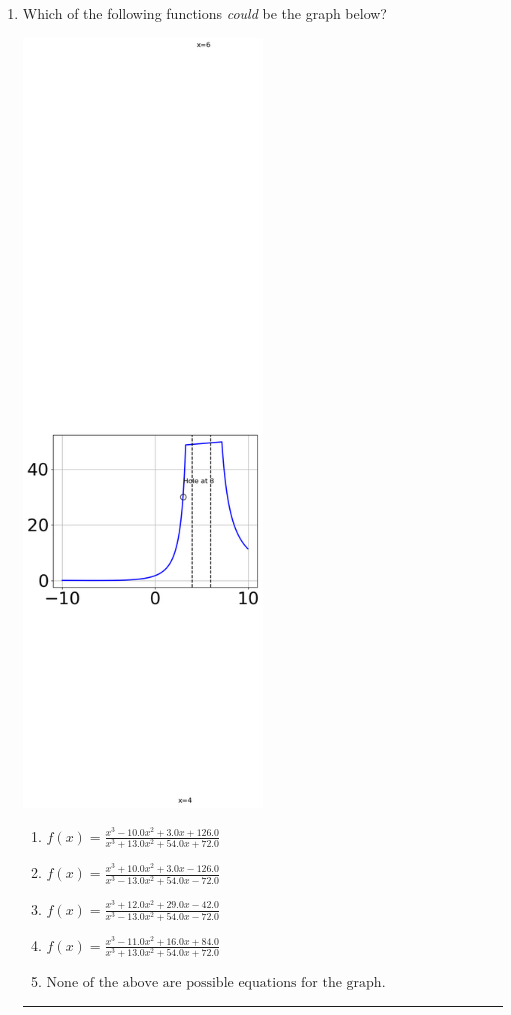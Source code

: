 \documentclass[14pt]{extbook}
\newcommand{\litem}[1]{\item#1\hspace*{-1cm}\rule{\textwidth}{0.4pt}}
\begin{document}
\begin{enumerate}
{\begin{enumerate}[label=\Alph*.]
\end{enumerate} }
\litem{
Which of the following functions \textit{could} be the graph below?
\begin{center}
    \includegraphics[width=0.5\textwidth]{../Figures/identifyGraphOfRationalFunctionCopyC.png}
\end{center}
\begin{enumerate}[label=\Alph*.]
\item \( f(x)=\frac{x^{3} -10.0 x^{2} +3.0 x + 126.0}{x^{3} +13.0 x^{2} +54.0 x + 72.0} \)
\item \( f(x)=\frac{x^{3} +10.0 x^{2} +3.0 x -126.0}{x^{3} -13.0 x^{2} +54.0 x -72.0} \)
\item \( f(x)=\frac{x^{3} +12.0 x^{2} +29.0 x -42.0}{x^{3} -13.0 x^{2} +54.0 x -72.0} \)
\item \( f(x)=\frac{x^{3} -11.0 x^{2} +16.0 x + 84.0}{x^{3} +13.0 x^{2} +54.0 x + 72.0} \)
\item \( \text{None of the above are possible equations for the graph.} \)


\end{enumerate}}
\end{enumerate}
\end{document}
